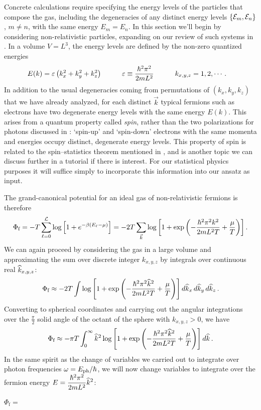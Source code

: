Concrete calculations require specifying the energy levels of the particles that compose the gas, including the degeneracies of any distinct energy levels $\left\{\mathcal E_m, \mathcal E_n\right\}$, $m \neq n$, with the same energy $E_m = E_n$.
In this section we'll begin by considering non-relativistic particles, expanding on our review of such systems in .
In a volume $V = L^3$, the energy levels are defined by the non-zero quantized energies
\begin{align*}
  E(k) & = \varepsilon \left(k_x^2 + k_y^2 + k_z^2\right) \qquad &
  \varepsilon & \equiv \frac{\hbar^2 \pi^2}{2mL^2} \qquad &
  k_{x, y, z} & = 1, 2, \cdots.
\end{align*}
In addition to the usual degeneracies coming from permutations of $(k_x, k_y, k_z)$ that we have already analyzed, for each distinct $\vec k$ typical fermions such as electrons have two degenerate energy levels with the same energy $E(k)$.
This arises from a quantum property called \textit{spin}, rather than the two polarizations for photons discussed in : `spin-up' and `spin-down' electrons with the same momenta and energies occupy distinct, degenerate energy levels.
This property of spin is related to the spin--statistics theorem mentioned in , and is another topic we can discuss further in a tutorial if there is interest.
For our statistical physics purposes it will suffice simply to incorporate this information into our ansatz as input.

The grand-canonical potential for an ideal gas of non-relativistic fermions is therefore
\begin{equation*}
  \Phi_{\text{f}} = -T \sum_{\ell = 0}^{\mathcal L} \log\left[1 + e^{-\beta (E_{\ell} - \mu)}\right] = -2T \sum_{\vec k} \log\left[1 + \exp\left(-\frac{\hbar^2 \pi^2 k^2}{2mL^2 T} + \frac{\mu}{T}\right)\right].
\end{equation*}
We can again proceed by considering the gas in a large volume and approximating the sum over discrete integer $k_{x, y, z}$ by integrals over continuous real $\widehat k_{x, y, z}$:
\begin{equation*}
  \Phi_{\text{f}} \approx -2T \int \log\left[1 + \exp\left(-\frac{\hbar^2 \pi^2 \widehat k^2}{2mL^2 T} + \frac{\mu}{T}\right)\right] \mathop{d\widehat k_x} \mathop{d\widehat k_y} \mathop{d\widehat k_z}.
\end{equation*}
Converting to spherical coordinates and carrying out the angular integrations over the $\frac{\pi}{2}$ solid angle of the octant of the sphere with $k_{x, y, z} > 0$, we have
\begin{equation*}
  \Phi_{\text{f}} \approx -\pi T \int_0^{\infty} \widehat k^2 \log\left[1 + \exp\left(-\frac{\hbar^2 \pi^2 \widehat k^2}{2mL^2 T} + \frac{\mu}{T}\right)\right] \mathop{d\widehat k}.
\end{equation*}
In the same spirit as the change of variables we carried out to integrate over photon frequencies $\omega = E_{\text{ph}} / \hbar$, we will now change variables to integrate over the fermion energy $E = \displaystyle \frac{\hbar^2 \pi^2}{2mL^2}\widehat k^2$:
\begin{mdframed}
  $\displaystyle \Phi_{\text{f}} = $ \\[120 pt]
\end{mdframed}

